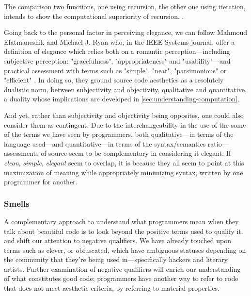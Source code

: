 \begin{listing}
  \inputminted{csharp}{./corpus/recursive_iteration.cs}
  \caption{The comparison two functions, one using recursion, the other one using iteration, intends to show the computational superiority of recursion. \citep{amit_answer_2012}.}
  \label{code:recursion_iteration_csharp}
\end{listing}

Going back to the personal factor in perceiving elegance, we can follow Mahmoud Efatmaneshik and Michael J. Ryan who, in the IEEE Systems journal, offer a definition of elegance which relies both on a romantic perception—including subjective perception: "gracefulness", "appropriateness" and "usability"—and practical assessment with terms such as "simple", "neat", "parsimonious" or "efficient" \citep{efatmaneshnik_definitions_2019}. In doing so, they ground source code aesthetics as a resolutely dualistic norm, between subjectivity and objectivity, qualitative and quantitative, a duality whose implications are developed in \autoref{sec:understanding-computation}.

And yet, rather than subjectivity and objectivity being opposites, one could also consider them as contingent. \nohyphens{Due to the interchangeability in the use of the some of the terms we have seen by programmers, both qualitative—in terms of the language used—and quantitative—in terms of the syntax/semantics ratio—assessments of source seem to be complementary in considering it elegant}. If \emph{clean}, \emph{simple}, \emph{elegant} seem to overlap, it is because they all seem to point at this maximization of meaning while appropriately minimizing syntax, written by one programmer for another.

\subsubsection{Smells}
\label{subsubsec:smells}

A complementary approach to understand what programmers mean when they talk about beautiful code is to look beyond the positive terms used to qualify it, and shift our attention to negative qualifiers. We have already touched upon terms such as clever, or obfuscated, which have ambiguous statuses depending on the community that they're being used in—specifically hackers and literary artists. Further examination of negative qualifiers will enrich our understanding of what constitutes good code; programmers have another way to refer to code that does not meet aesthetic criteria, by referring to material properties.

